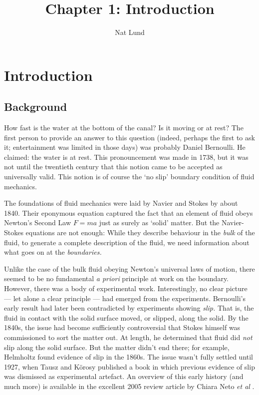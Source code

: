 \documentclass[12pt, a4paper, twoside, openright]{book}
\author{Nat Lund}
\title{Chapter 1: Introduction}
\begin{document}
\chapter{Introduction}\label{C:intro}

\section{Background}

How fast is the water at the bottom of the canal? Is it moving or at rest? The first person to provide an answer to this question (indeed, perhaps the first to ask it; entertainment was limited in those days) was probably Daniel Bernoulli. He claimed: the water is at rest. This pronouncement was made in 1738, but it was not until the twentieth century that this notion came to be accepted as universally valid. This notion is of course the `no slip' boundary condition of fluid mechanics.

The foundations of fluid mechanics were laid by Navier and Stokes by about 1840. Their eponymous equation captured the fact that an element of fluid obeys Newton's Second Law $F=ma$ just as surely as `solid' matter. But the Navier-Stokes equations are not enough: While they describe behaviour in the \emph{bulk} of the fluid, to generate a complete description of the fluid, we need information about what goes on at the \emph{boundaries.}

Unlike the case of the bulk fluid obeying Newton's universal laws of motion, there seemed to be no fundamental \emph{a priori} principle at work on the boundary. However, there was a body of experimental work. Interestingly, no clear picture --- let alone a clear principle --- had emerged from the experiments.  Bernoulli's early result had later been contradicted by experiments showing \emph{slip.} That is, the fluid in contact with the solid surface moved, or slipped, along the solid. By the 1840s, the issue had become sufficiently controversial that Stokes himself was commissioned to sort the matter out. At length, he determined that fluid did \emph{not} slip along the solid surface. But the matter didn't end there; for example, Helmholtz found evidence of slip in the 1860s. The issue wasn't fully settled until 1927, when Tausz and K\"orosy published a book in which previous evidence of slip was dismissed as experimental artefact. An overview of this early history (and much more) is available in the excellent 2005 review article by Chiara Neto \emph{et al} \cite{NetoReview2005}.
\end{document}

